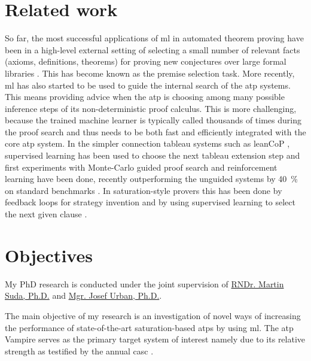 \documentclass{article}
\begin{document}
\section{Related work}

So far, the most successful applications of \gls{ml} in automated theorem proving have been in a high-level external setting of selecting a small number of relevant facts (axioms, definitions, theorems) for proving new conjectures over large formal libraries \cite{DBLP:journals/jar/AlamaHKTU14,DBLP:journals/jar/BlanchetteGKKU16,DBLP:conf/cpp/GauthierK15}.
This has become known as the premise selection task.
More recently, \gls{ml} has also started to be used to guide the internal search of the \gls{atp} systems.
This means providing advice when the \gls{atp} is choosing among many possible inference steps of its non-deterministic proof calculus.
This is more challenging, because the trained machine learner is typically called thousands of times during the proof search and thus needs to be both fast and efficiently integrated with the core \gls{atp} system.
In the simpler connection tableau systems such as leanCoP \cite{10.1007/978-3-540-71070-7_23}, supervised learning has been used to choose the next tableau extension step \cite{DBLP:journals/jar/FarberKU21} and first experiments with Monte-Carlo guided proof search and reinforcement learning have been done, recently outperforming the unguided systems by \SI{40}{\percent} on standard benchmarks \cite{DBLP:conf/nips/KaliszykUMO18}.
In saturation-style provers this has been done by feedback loops for strategy invention \cite{DBLP:journals/aicom/JakubuvU18,DBLP:conf/gcai/SchaferS15} and by using supervised learning \cite{DBLP:conf/cade/JakubuvCOP0U20,DBLP:conf/lpar/LoosISK17} to select the next given clause \cite{McCune2003}.


\section{Objectives}

My PhD research is conducted under the joint supervision of
\href{http://people.ciirc.cvut.cz/~sudamar2/}{RNDr. Martin Suda, Ph.D.} and
\href{https://people.ciirc.cvut.cz/~urbanjo3/}{Mgr. Josef Urban, Ph.D.}.

The main objective of my research is an investigation of novel ways of increasing the performance of state-of-the-art saturation-based \glspl{atp} by using \gls{ml}.
The \gls{atp} Vampire \cite{Kovacs2013} serves as the primary target system of interest
namely due to its relative strength
as testified by the annual \gls{casc} \cite{Sut16}.
\end{document}
